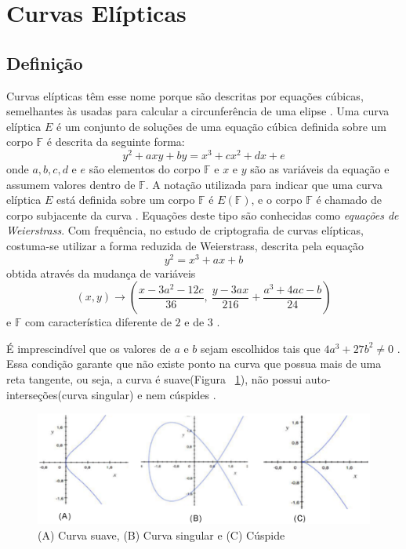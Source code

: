 %
%
\section{Curvas Elípticas}

%
%
\subsection{Definição}
Curvas elípticas têm esse nome porque são descritas por equações cúbicas, semelhantes às usadas para calcular a circunferência de uma elipse \cite{Stallings:2011}. Uma curva elíptica \(E\) é um conjunto de soluções de uma equação cúbica definida sobre um corpo \(\mathbb{F}\) é descrita da seguinte forma:
\begin{equation}
y^2 + axy + by = x^3 + cx^2 + dx + e \label{eq:5}
\end{equation}
onde \(a, b, c, d\) e \(e\) são elementos do corpo \(\mathbb{F}\) e \(x\) e \(y\) são as variáveis da equação e assumem valores dentro de \(\mathbb{F}\). A notação utilizada para indicar que uma curva elíptica \(E\) está definida sobre um corpo \(\mathbb{F}\) é $E(\mathbb{F})$, e o corpo \(\mathbb{F}\) é chamado de corpo subjacente da curva \cite{Guide}. Equações deste tipo são conhecidas como \textit{equações de Weierstrass}. Com frequência, no estudo de criptografia de curvas elípticas, costuma-se utilizar a forma reduzida de Weierstrass, descrita pela equação
\begin{equation}
y^2 = x^3 + ax + b \label{eq:6}
\end{equation}
obtida através da mudança de variáveis
\begin{equation}
  (x, y) \rightarrow \left(\frac{x - 3a^2 - 12c}{36},\ \frac{y - 3ax}{216} + \frac{a^3 + 4ac - b}{24}\right)
\end{equation}
e \(\mathbb{F}\) com característica diferente de \(2\) e de \(3\) \cite{Guide}.

É imprescindível que os valores de \(a\) e \(b\) sejam escolhidos tais que $4a^3 + 27b^2 \ne 0$ \cite{Mandy:2007}. Essa condição garante que não existe ponto na curva que possua mais de uma reta tangente, ou seja, a curva é suave(Figura ~\ref{fig:cuspide}), não possui auto-interseções(curva singular) e nem cúspides \cite{Guide}.
\begin{figure}
\includegraphics[scale=0.6, bb=0 0 515 478]{figuras/curva_suave_singular_cuspide.eps}
\caption{(A) Curva suave, (B) Curva singular e (C) Cúspide}
\label{fig:cuspide}
\end{figure}

